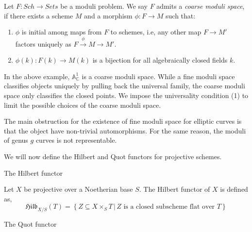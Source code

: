 \documentclass[ignorenonframetext,t]{beamer}
\newcommand{\A}{{\mathbb A}}
\newcommand{\C}{{\mathbb C}}
\theoremstyle{definition}
\begin{document}
\begin{definition}
	Let $F: \mathit{Sch}\rightarrow \mathit{Sets}$ be a moduli problem. We say $F$ admits a \textit{coarse moduli space}, if there exists a scheme $M$ and a morphism $\phi: F\rightarrow M$ such that:
	\begin{enumerate}
		\item $\phi$ is initial among maps from $F$ to schemes, i.e, any other map $F\rightarrow M'$ factors uniquely as $F\overset{\phi}{\rightarrow} M \rightarrow M'$.
		\item $\phi(k): F(k)\rightarrow M(k)$ is a bijection for all algebraically closed fields $k$.
	\end{enumerate}
\end{definition}

In the above example, $\A^1_\C$ is a coarse moduli space. While a fine moduli space classifies objects uniquely by pulling back the universal family, the coarse moduli space only classifies the closed points. We impose the universality condition (1) to limit the possible choices of the coarse moduli space.

The main obstruction for the existence of fine moduli space for elliptic curves is that the object have non-trivial automorphisms. For the same reason, the moduli of genus $g$ curves is not representable.


We will now define the Hilbert and Quot functors for projective schemes.

\begin{frame}
	The Hilbert functor
\end{frame} 

\begin{definition}
	Let $X$ be projective over a Noetherian base $S$. The Hilbert functor of $X$ is defined as,
	\begin{equation*}
	\mathfrak{Hilb}_{X/S}(T)=\left\{
	Z \subseteq X\times_S T \,
	\left|\,\text{$Z$ is a closed subscheme flat over $T$}\right.
	\right\}
	\end{equation*}
\end{definition}

\begin{frame}
	The Quot functor
\end{frame}
	
\end{document}
